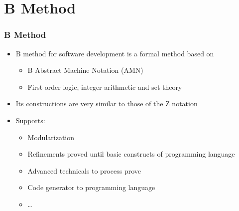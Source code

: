 \section{B Method}

\begin{frame}
\hypertarget{metodoB}{}
  \frametitle{B Method} 
  \begin{itemize}
    \item B method for software development is a formal method based on
	    \begin{itemize}
	    \item  B Abstract Machine Notation (AMN)
	    \item  First order logic, integer arithmetic and set theory
	    \end{itemize}
    \item Its constructions are very similar to those of the Z notation    
    \item Supports:
    \begin{itemize}
	    \item Modularization
	    \item Refinements proved until basic constructs of programming language 
	    \item Advanced technicals to process prove 
	    \item Code generator to programming language
	    \item \ldots
    \end{itemize}   
  \end{itemize}
\end{frame}
    
